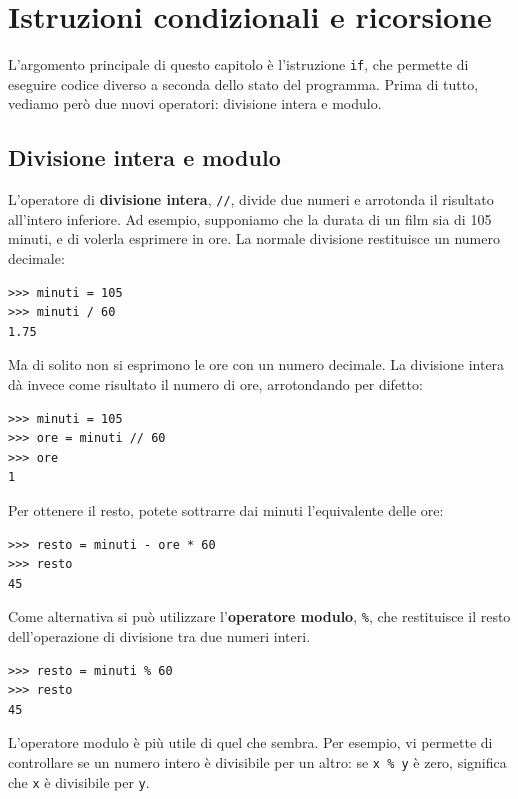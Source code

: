 \documentclass[10pt]{book}
\begin{document}
\chapter{Istruzioni condizionali e ricorsione}

L'argomento principale di questo capitolo è l'istruzione {\tt if}, che permette di eseguire codice diverso a seconda dello stato del programma. Prima di tutto, vediamo però due nuovi operatori: divisione intera e modulo.

\section{Divisione intera e modulo}

L'operatore di {\bf divisione intera}, \verb"//", divide due numeri e arrotonda il risultato all'intero inferiore. Ad esempio, supponiamo che la durata di un film sia di 105 minuti, e di volerla esprimere in ore. La normale divisione  restituisce un numero decimale:

\begin{verbatim}
>>> minuti = 105
>>> minuti / 60
1.75
\end{verbatim}

Ma di solito non si esprimono le ore con un numero decimale. La divisione intera dà invece come risultato il numero di ore, arrotondando per difetto:

\begin{verbatim}
>>> minuti = 105
>>> ore = minuti // 60
>>> ore
1
\end{verbatim}

Per ottenere il resto, potete sottrarre dai minuti l'equivalente delle ore:

\begin{verbatim}
>>> resto = minuti - ore * 60
>>> resto
45
\end{verbatim}


Come alternativa si può utilizzare l'{\bf operatore modulo}, \verb"%", che 
restituisce il resto dell'operazione di divisione tra due numeri interi.

\begin{verbatim}
>>> resto = minuti % 60
>>> resto
45
\end{verbatim}
%

L'operatore modulo è più utile di quel che sembra. Per esempio, vi permette di controllare se un numero intero è divisibile per un altro: se
{\tt x \% y} è zero, significa che {\tt x} è divisibile per {\tt y}.
\end{document}
